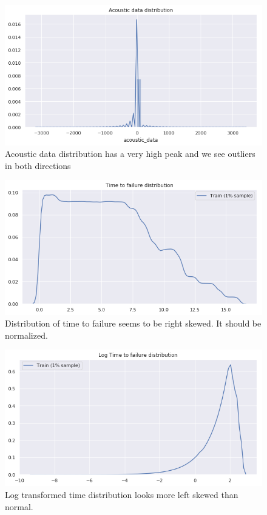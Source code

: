 \documentclass[]{llncs} %
\begin{document}
\begin{figure}
	\centering
	\includegraphics[width=.9\linewidth]{acousticDataDistribution}
	\caption{Acoustic data distribution has a very high peak and we see outliers in both directions}
	\label{fig:acousticDataDistribution}
\end{figure}
\begin{figure}
	\centering
	\includegraphics[width=.9\linewidth]{timeToFailureDistribution}
	\caption{Distribution of time to failure seems to be right skewed. It should be normalized.}
	\label{fig:timeToFailureDistribution}
\end{figure}
\begin{figure}
	\centering
	\includegraphics[width=.9\linewidth]{logTimeToFailureDistribution}
	\caption{Log transformed time distribution looks more left skewed than normal.}
	\label{fig:logTimeToFailureDistribution}
\end{figure}
\end{document}
